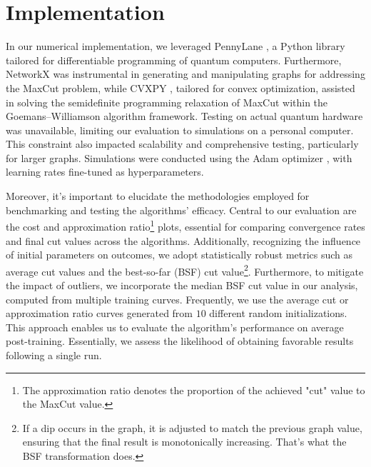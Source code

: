 \section{Implementation}
\label{sec:resul}

In our numerical implementation, we leveraged PennyLane \cite{Pennylane}, a Python library tailored for differentiable programming of quantum computers. Furthermore, NetworkX \cite{NetworkX} was instrumental in generating and manipulating graphs for addressing the MaxCut problem, while CVXPY \cite{cvxpy}, tailored for convex optimization, assisted in solving the semidefinite programming relaxation of MaxCut within the Goemans–Williamson algorithm framework. Testing on actual quantum hardware was unavailable, limiting our evaluation to simulations on a personal computer. This constraint also impacted scalability and comprehensive testing, particularly for larger graphs. Simulations were conducted using the Adam optimizer \cite{kingma2017adam}, with learning rates fine-tuned as hyperparameters.


Moreover, it's important to elucidate the methodologies employed for benchmarking and testing the algorithms' efficacy. Central to our evaluation are the cost and approximation ratio\footnote{The approximation ratio denotes the proportion of the achieved "cut" value to the MaxCut value.} plots, essential for comparing convergence rates and final cut values across the algorithms. Additionally, recognizing the influence of initial parameters on outcomes, we adopt statistically robust metrics such as average cut values and the best-so-far (BSF) cut value\footnote{If a dip occurs in the graph, it is adjusted to match the previous graph value, ensuring that the final result is monotonically increasing. That's what the BSF transformation does.}. Furthermore, to mitigate the impact of outliers, we incorporate the median BSF cut value in our analysis, computed from multiple training curves. Frequently, we use the average cut or approximation ratio curves generated from $10$ different random initializations. This approach enables us to evaluate the algorithm's performance on average post-training. Essentially, we assess the likelihood of obtaining favorable results following a single run.

